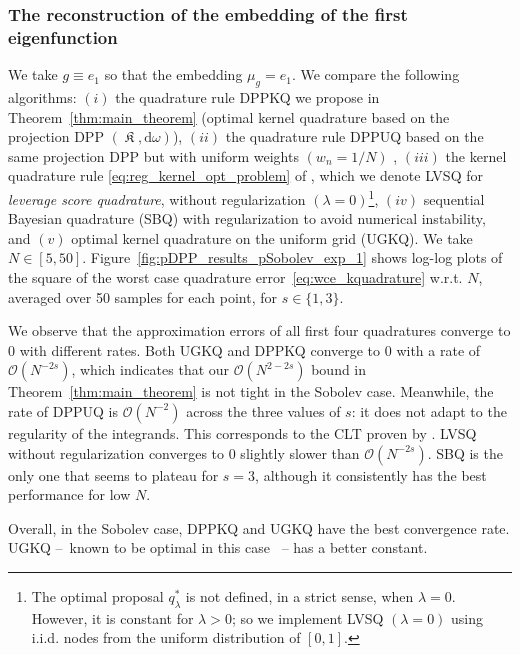 \documentclass[twoside,11pt]{book}
\numberwithin{theorem}{chapter}
\numberwithin{definition}{chapter}
\numberwithin{proposition}{chapter}
\numberwithin{corollary}{chapter}
\numberwithin{example}{chapter}
\numberwithin{lemma}{chapter}
\numberwithin{assumption}{chapter}
\numberwithin{equation}{chapter}
\numberwithin{figure}{chapter}
\DeclareMathOperator*{\KDPP}{\mathfrak{K}}
\begin{document}
\subsubsection{The reconstruction of the embedding of the first eigenfunction}
 We take $g\equiv e_{1}$ so that the embedding $\mu_{g} = e_{1}$. We compare the following algorithms: $(i)$ the quadrature rule DPPKQ we propose in Theorem~\ref{thm:main_theorem} (optimal kernel quadrature based on the projection DPP $(\KDPP, \mathrm{d}\omega)$), $(ii)$ the quadrature rule DPPUQ based on the same projection DPP but with uniform weights $(w_{n} = 1/N)$ \citep{Joh97}, $(iii)$ the kernel quadrature rule \eqref{eq:reg_kernel_opt_problem} of \cite{Bac17}, which we denote LVSQ for \emph{leverage score quadrature}, without regularization $(\lambda =0)$\footnote{The optimal proposal $q_{\lambda}^*$ is not defined, in a strict sense, when $\lambda = 0$. However, it is constant for $\lambda>0$; so we implement LVSQ $(\lambda = 0)$ using i.i.d. nodes from the uniform distribution of $[0,1]$.}, $(iv)$ sequential Bayesian quadrature (SBQ) \citep{HuDu12} with regularization to avoid numerical instability, and $(v)$ optimal kernel quadrature on the uniform grid (UGKQ). We take $N \in [5,50]$. Figure~\ref{fig:pDPP_results_pSobolev_exp_1} shows log-log plots of the square of the worst case quadrature error~\eqref{eq:wce_kquadrature} w.r.t. $N$, averaged over 50 samples for each point, for $s \in \{1,3\}$.


 We observe that the approximation errors of all first four quadratures converge to $0$ with different rates. Both UGKQ and DPPKQ converge to $0$ with a rate of $\mathcal{O}(N^{-2s})$, which indicates that our $\mathcal{O}(N^{2-2s})$ bound in Theorem~\ref{thm:main_theorem} is not tight in the Sobolev case. Meanwhile, the rate of DPPUQ is $\mathcal{O}(N^{-2})$ across the three values of $s$: it does not adapt to the regularity of the integrands. This corresponds to the CLT proven by \cite{Joh97}.
  LVSQ without regularization converges to $0$ slightly slower than $\mathcal{O}(N^{-2s})$. SBQ is the only one that seems to plateau for $s = 3$, although it consistently has the best performance for low $N$.


Overall, in the Sobolev case, DPPKQ and UGKQ have the best convergence rate. UGKQ --~known to be optimal in this case \citep{Boj81}~-- has a better constant.
\end{document}

